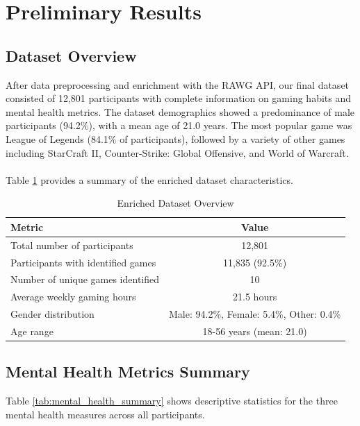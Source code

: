 \documentclass[12pt]{article}
\begin{document}
\section{Preliminary Results}

\subsection{Dataset Overview}

After data preprocessing and enrichment with the RAWG API, our final dataset consisted of 12,801 participants with complete information on gaming habits and mental health metrics. The dataset demographics showed a predominance of male participants (94.2\%), with a mean age of 21.0 years. The most popular game was League of Legends (84.1\% of participants), followed by a variety of other games including StarCraft II, Counter-Strike: Global Offensive, and World of Warcraft. \\
\\
Table \ref{tab:dataset_overview} provides a summary of the enriched dataset characteristics.

\begin{table}[h]
\centering
\caption{Enriched Dataset Overview}
\label{tab:dataset_overview}
\begin{tabular}{lc}
\toprule
\textbf{Metric} & \textbf{Value} \\
\midrule
Total number of participants & 12,801 \\
Participants with identified games & 11,835 (92.5\%) \\
Number of unique games identified & 10 \\
Average weekly gaming hours & 21.5 hours \\
Gender distribution & Male: 94.2\%, Female: 5.4\%, Other: 0.4\% \\
Age range & 18-56 years (mean: 21.0) \\
\bottomrule
\end{tabular}
\end{table}

\subsection{Mental Health Metrics Summary}

Table \ref{tab:mental_health_summary} shows descriptive statistics for the three mental health measures across all participants.
\end{document}
